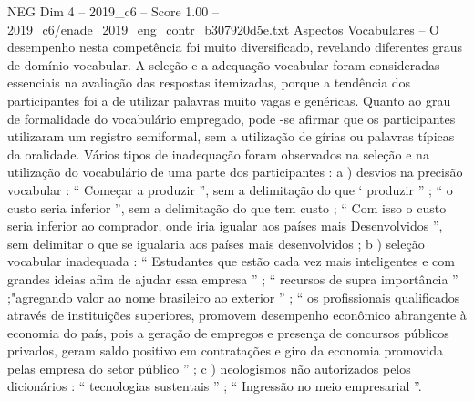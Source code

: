 \begin{textsample}{NEG Dim 4 – 2019\_c6 – Score 1.00 – 2019\_c6/enade\_2019\_eng\_contr\_b307920d5e.txt}
Aspectos Vocabulares – O desempenho nesta competência foi muito diversificado, revelando diferentes graus de domínio vocabular.
A seleção e a adequação vocabular foram consideradas essenciais na avaliação das respostas itemizadas, porque a tendência dos participantes foi a de utilizar palavras muito vagas e genéricas.
Quanto ao grau de formalidade do vocabulário empregado, pode -se afirmar que os participantes utilizaram um registro semiformal, sem a utilização de gírias ou palavras típicas da oralidade.
Vários tipos de inadequação foram observados na seleção e na utilização do vocabulário de uma parte dos participantes : a ) desvios na precisão vocabular : “ Começar a produzir ”, sem a delimitação do que ‘ produzir ” ; “ o custo seria inferior ”, sem a delimitação do que tem custo ; “ Com isso o custo seria inferior ao comprador, onde iria igualar aos países mais Desenvolvidos ”, sem delimitar o que se igualaria aos países mais desenvolvidos ; b ) seleção vocabular inadequada : “ Estudantes que estão cada vez mais inteligentes e com grandes ideias afim de ajudar essa empresa ” ; “ recursos de supra importância ” ;"agregando valor ao nome brasileiro ao exterior ” ; “ os profissionais qualificados através de instituições superiores, promovem desempenho econômico abrangente à economia do país, pois a geração de empregos e presença de concursos públicos privados, geram saldo positivo em contratações e giro da economia promovida pelas empresa do setor público ” ; c ) neologismos não autorizados pelos dicionários : “ tecnologias sustentais ” ; “ Ingressão no meio empresarial ”.

\end{textsample}
